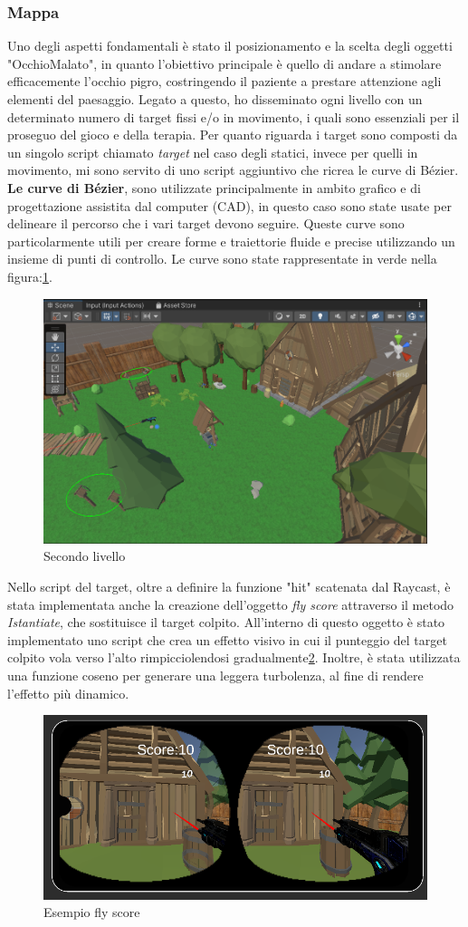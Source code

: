 \documentclass[
a4paper,
cleardoublepage=empty,
headings=twolinechapter,
numbers=autoenddot,
]{scrbook}
\begin{document}
    \subsubsection{Mappa}
    Uno degli aspetti fondamentali è stato il posizionamento e la scelta degli oggetti "OcchioMalato", in quanto l'obiettivo principale è quello di andare a stimolare efficacemente l'occhio pigro, costringendo il paziente a prestare attenzione agli elementi del paesaggio.
    Legato a questo, ho disseminato ogni livello con un determinato numero di target fissi e/o in movimento, i quali sono essenziali per il proseguo del gioco e della terapia.
    Per quanto riguarda i target sono composti da un singolo script chiamato \textit{target} nel caso degli statici, invece per quelli in movimento, mi sono servito di uno script aggiuntivo che ricrea le curve di Bézier\cite{Pack_asset}.
    \textbf{Le curve di Bézier}\cite{Path_asset}, sono utilizzate principalmente in ambito grafico e di progettazione assistita dal computer (CAD), in questo caso sono state usate per delineare il percorso che i vari target devono seguire. Queste curve sono particolarmente utili per creare forme e traiettorie fluide e precise utilizzando un insieme di punti di controllo.
    Le curve sono state rappresentate in verde nella figura:\ref{fig:mappa}.
     \begin{figure}[H]
    	\centering
    	\includegraphics[width=0.6\linewidth]{image/mappa}
    	\caption{Secondo livello}
    	\label{fig:mappa}
    \end{figure}
    Nello script del target, oltre a definire la funzione "hit" scatenata dal Raycast, è stata implementata anche la creazione dell'oggetto \textit{fly score} attraverso il metodo \textit{Istantiate}, che sostituisce il target colpito. All'interno di questo oggetto è stato implementato uno script che crea un effetto visivo in cui il punteggio del target colpito vola verso l'alto rimpicciolendosi gradualmente\ref{fig:fly score}. Inoltre, è stata utilizzata una funzione coseno per generare una leggera turbolenza, al fine di rendere l'effetto più dinamico.
     \begin{figure}[H]
    	\centering
    	\includegraphics[width=0.6\linewidth]{image/fly score}
    	\caption{Esempio fly score}
    	\label{fig:fly score}
    \end{figure}
\end{document}
